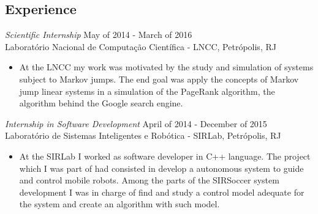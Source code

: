 \documentclass[margin, 10pt]{res} %
\begin{document}
\begin{resume}

 


 
\section{Experience}

{\sl Scientific Internship} \hfill May of 2014 - March of 2016\\
Laboratório Nacional de Computação Científica - LNCC, Petrópolis, RJ 
\begin{itemize} \itemsep -2pt %
\item At the LNCC my work was motivated by the study and simulation of systems subject to Markov jumps. The end goal was apply the concepts of Markov jump linear systems in a simulation of the PageRank algorithm, the algorithm behind the Google search engine.
\end{itemize}

{\sl Internship in Software Development} \hfill April of 2014 - December of 2015\\
Laboratório de Sistemas Inteligentes e Robótica - SIRLab, Petrópolis, RJ 
\begin{itemize} \itemsep -2pt %
\item At the SIRLab I worked as software developer in C++ language. The project which I was part of had consisted in develop a autonomous system to guide and control mobile robots. Among the parts of the SIRSoccer system development I was in charge of find and study a control model adequate for the system and create an algorithm with such model.
\end{itemize}



\end{resume}
\end{document}
